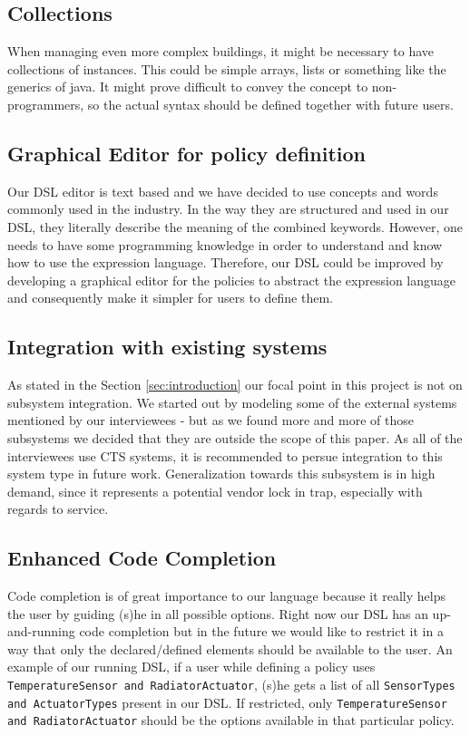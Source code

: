 \subsection{Collections}\label{subsec:collections}
When managing even more complex buildings, it might be necessary to have collections of instances. This could be simple arrays, lists or something like the generics of java. It might prove difficult to convey the concept to non-programmers, so the actual syntax should be defined together with future users.

\subsection{Graphical Editor for policy definition}\label{subsec:graphicaleditor}
Our DSL editor is text based and we have decided to use concepts and words commonly used in the industry. In the way they are structured and used in our DSL, they literally describe the meaning of the combined keywords. However, one needs to have some programming knowledge in order to understand and know how to use the expression language. Therefore, our DSL could be improved by developing a graphical editor for the policies to abstract the expression language and consequently make it simpler for users to define them.

\subsection{Integration with existing systems}\label{subsec:integration}
As stated in the Section \ref{sec:introduction} our focal point in this project is not on subsystem integration. We started out by modeling some of the external systems mentioned by our interviewees - but as we found more and more of those subsystems we decided that they are outside the scope of this paper. As all of the interviewees use CTS systems, it is recommended to persue integration to this system type in future work. Generalization towards this subsystem is in high demand, since it represents a potential vendor lock in trap, especially with regards to service.

\subsection{Enhanced Code Completion}\label{subsec:codecompletion}
Code completion is of great importance to our language because it really helps the user by guiding (s)he in all possible options. Right now our DSL has an up-and-running code completion but in the future we would like to restrict it in a way that only the declared/defined elements should be available to the user. An example of our running DSL, if a user while defining a policy uses \texttt{TemperatureSensor and RadiatorActuator}, (s)he gets a list of all \texttt{SensorTypes and ActuatorTypes} present in our DSL. If restricted, only \texttt{TemperatureSensor and RadiatorActuator} should be the options available in that particular policy.


